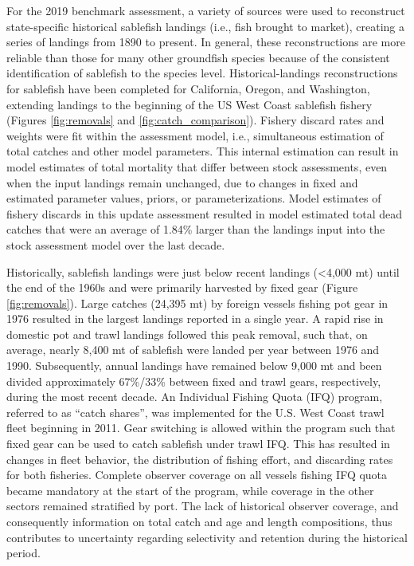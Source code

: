 \documentclass[11pt,
  english,
  a4paper,
]{article}
\begin{document}
For the 2019 benchmark assessment, a variety of sources were used to reconstruct state-specific historical sablefish landings (i.e., fish brought to market), creating a series of landings from 1890 to present. In general, these reconstructions are more reliable than those for many other groundfish species because of the consistent identification of sablefish to the species level. Historical-landings reconstructions for sablefish have been completed for California, Oregon, and Washington, extending landings to the beginning of the US West Coast sablefish fishery (Figures \ref{fig:removals} and \ref{fig:catch_comparison}). Fishery discard rates and weights were fit within the assessment model, i.e., simultaneous estimation of total catches and other model parameters. This internal estimation can result in model estimates of total mortality that differ between stock assessments, even when the input landings remain unchanged, due to changes in fixed and estimated parameter values, priors, or parameterizations. Model estimates of fishery discards in this update assessment resulted in model estimated total dead catches that were an average of 1.84\% larger than the landings input into the stock assessment model over the last decade.

\leavevmode\tagmcend\tagstructend\par


Historically, sablefish landings were just below recent landings (\textless4,000 mt) until the end of the 1960s and were primarily harvested by fixed gear (Figure \ref{fig:removals}). Large catches (24,395 mt) by foreign vessels fishing pot gear in 1976 resulted in the largest landings reported in a single year. A rapid rise in domestic pot and trawl landings followed this peak removal, such that, on average, nearly 8,400 mt of sablefish were landed per year between 1976 and 1990. Subsequently, annual landings have remained below 9,000 mt and been divided approximately 67\%/33\% between fixed and trawl gears, respectively, during the most recent decade. An Individual Fishing Quota (IFQ) program, referred to as ``catch shares'', was implemented for the U.S. West Coast trawl fleet beginning in 2011. Gear switching is allowed within the program such that fixed gear can be used to catch sablefish under trawl IFQ. This has resulted in changes in fleet behavior, the distribution of fishing effort, and discarding rates for both fisheries. Complete observer coverage on all vessels fishing IFQ quota became mandatory at the start of the program, while coverage in the other sectors remained stratified by port. The lack of historical observer coverage, and consequently information on total catch and age and length compositions, thus contributes to uncertainty regarding selectivity and retention during the historical period.
\end{document}
